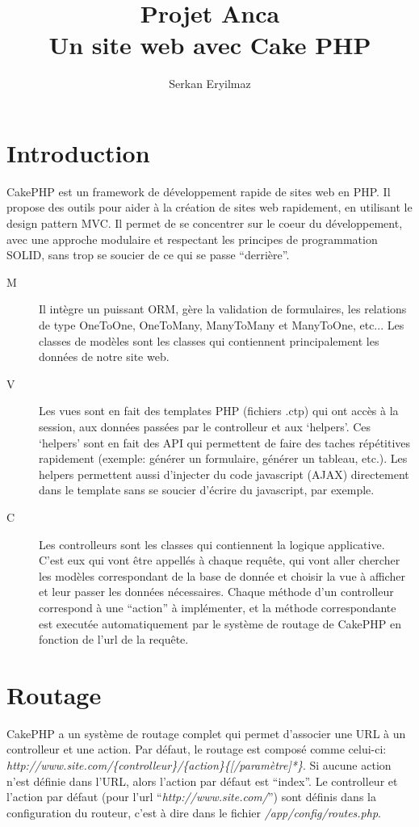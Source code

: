 \documentclass[12pt]{article}
\author{Serkan Eryilmaz}
\title{Projet Anca\\Un site web avec Cake PHP}
\begin{document}
\maketitle
\tableofcontents
  \newpage
  \section{Introduction}
    CakePHP est un framework de développement rapide de sites web en PHP. Il propose des outils pour aider à la création de sites web rapidement, en utilisant le design pattern MVC. Il permet de se concentrer sur le coeur du développement, avec une approche modulaire et respectant les principes de programmation SOLID, sans trop se soucier de ce qui se passe “derrière”.

    \begin{description}
      \item[M] Il intègre un puissant ORM, gère la validation de formulaires, les relations de type OneToOne, OneToMany, ManyToMany et ManyToOne, etc... Les classes de modèles sont les classes qui contiennent principalement les données de notre site web.
    
      \item[V] Les vues sont en fait des templates PHP (fichiers .ctp) qui ont accès à la session, aux données passées par le controlleur et aux `helpers'. Ces `helpers' sont en fait des API qui permettent de faire des taches répétitives rapidement (exemple: générer un formulaire, générer un tableau, etc.). Les helpers permettent aussi d'injecter du code javascript (AJAX) directement dans le template sans se soucier d'écrire du javascript, par exemple.

      \item[C] Les controlleurs sont les classes qui contiennent la logique applicative. C'est eux qui vont être appellés à chaque requête, qui vont aller chercher les modèles correspondant de la base de donnée et choisir la vue à afficher et leur passer les données nécessaires. Chaque méthode d'un controlleur correspond à une “action” à implémenter, et la méthode correspondante est executée automatiquement par le système de routage de CakePHP en fonction de l'url de la requête.
    \end{description}
  \section{Routage}
    CakePHP a un système de routage complet qui permet d'associer une URL à un controlleur et une action. Par défaut, le routage est composé comme celui-ci: \emph{http://www.site.com/\{controlleur\}/\{action\}\{[/paramètre]*\}}.
Si aucune action n'est définie dans l'URL, alors l'action par défaut est “index”. Le controlleur et l'action par défaut (pour l'url ``\emph{http://www.site.com/}'') sont définis dans la configuration du routeur, c'est à dire dans le fichier \emph{/app/config/routes.php}.
\end{document}
